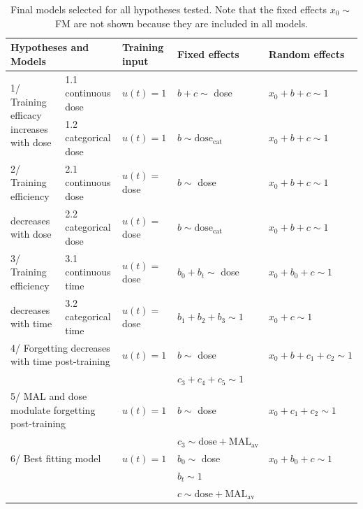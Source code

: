 \begin{table}[b]
	\footnotesize
	\begin{tabular}{|l|l|l|l|l|}
		\hline
		\multicolumn{2}{|l|}{Hypotheses and Models} & Training input & Fixed effects & Random effects \\
		\hline
		\multirow{2}{3cm}{1/ Training efficacy increases with dose}  & 1.1 continuous dose & $ u(t) = 1 $ & $ b + c \sim $ dose & $ x_0 + b + c \sim 1 $ \\
		\cline{2-5}
		& 1.2 categorical dose & $ u(t) = 1 $ & $ b \sim \text{dose}_\text{cat} $ & $ x_0 + b + c \sim 1 $ \\
		\hline
		2/ Training efficiency & 2.1 continuous dose & $ u(t) = $ dose & $ b \sim $ dose & $ x_0 + b + c \sim 1 $ \\ \cline{2-5}		
		decreases with dose & 2.2 categorical dose & $ u(t) = $ dose & $ b \sim \text{dose}_\text{cat} $ & $ x_0 + b + c \sim 1 $ \\
		\hline
		3/ Training efficiency & 3.1 continuous time & $ u(t) = $ dose & $ b_0 + b_t \sim $ dose & $ x_0 + b_0 + c \sim 1 $ \\ \cline{2-5}
		decreases with time & 3.2 categorical time & $ u(t) = $ dose & $ b_1 + b_2 + b_3 \sim 1 $ & $ x_0 + c \sim 1 $ \\
		\hline
		\multicolumn{2}{|l|}{4/ Forgetting decreases with time post-training} & $ u(t)=1 $ & $ b \sim $ dose & $ x_0+b+c_1+c_2 \sim 1 $\\		
		\multicolumn{2}{|l|}{} && $ c_3 + c_4 + c_5 \sim 1 $ & \\ 		
		\hline
		\multicolumn{2}{|l|}{5/ MAL and dose modulate forgetting post-training} & $ u(t)=1 $ & $ b \sim $ dose & $ x_0 + c_1 + c_2 \sim 1 $\\	
		\multicolumn{2}{|l|}{} && $ c_3 \sim \text{dose} + \text{MAL}_\text{av} $ & \\ 
		\hline
		\multicolumn{2}{|l|}{6/ Best fitting model} & $ u(t)=1 $ & $ b_0 \sim $ dose & $ x_0 + b_0 + c \sim 1 $\\	
		\multicolumn{2}{|l|}{} && $ b_t \sim 1 $ & \\ 
		\multicolumn{2}{|l|}{} && $ c \sim \text{dose} + \text{MAL}_\text{av} $ & \\ 
		\hline
	\end{tabular}
	\caption[Final models selected for all hypotheses tested.]{Final models selected for all hypotheses tested. Note that the fixed effects $ x_0 \sim $ FM are not shown because they are included in all models.}
	\label{tab:models}
\end{table}


